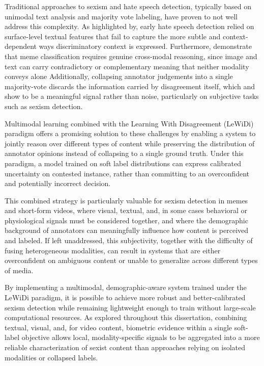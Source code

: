Traditional approaches to sexism and hate speech detection, typically based on unimodal text analysis and majority vote labeling, have proven to not well address this complexity. As highlighted by\cite{waseem2016hateful}, early hate speech detection relied on surface-level textual features
that fail to capture the more subtle and context-dependent ways discriminatory context is expressed. Furthermore,\cite{kiela2020hateful} demonstrate that meme classification requires genuine cross-modal reasoning, since image and text can carry contradictory or complementary meaning that neither modality conveys alone
Additionally, collapsing annotator judgements into a single majority-vote discards the information carried by disagreement itself, which\cite{uma2021learning} and
~\cite{plank2022problem} show to be a meaningful signal rather than noise, particularly on subjective tasks such as sexism detection.

Multimodal learning combined with the Learning With Disagreement (LeWiDi) paradigm offers a promising solution to these challenges by enabling a system to jointly reason over different types of content while preserving the distribution of annotator opinions
instead of collapsing to a single ground truth. Under this paradigm, a model trained on soft label distributions can express calibrated uncertainty on contested instance, rather than committing to an overconfident and potentially incorrect decision.

This combined strategy is particularly valuable for sexism detection in memes and short-form videos, where visual, textual, and, in some cases behavioral or physiological signals must be considered together, and where the demographic background of annotators can meaningfully influence how content is perceived and labeled. If left unaddressed, this subjectivity,
together with the difficulty of fusing heterogeneous modalities, can result in systems that are either overconfident on ambiguous content or unable to generalize across different types of media.

By implementing a multimodal, demographic-aware system trained under the LeWiDi paradigm, it is possible to achieve more robust and better-calibrated sexism detection while remaining lightweight enough to train without large-scale computational resources. As
explored throughout this dissertation, combining textual, visual, and, for video content, biometric evidence within a single soft-label objective allows local, modality-specific signals to be aggregated into a more reliable characterization of sexist content than approaches
relying on isolated modalities or collapsed labels.

